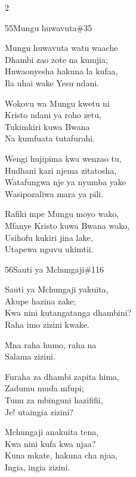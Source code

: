 \begin{multicols}{2}
\begin{hymn}{55}{Mungu huwavuta}{\#35}
\begin{stanza}
Mungu huwavuta watu waache\\
Dhambi zao zote na kumjia;\\
Huwaonyesha hakuna la kufaa,\\
Ila uhai wake Yesu ndani.
\end{stanza}
\begin{chorus}
Wokovu wa Mungu kwetu ni\\
Kristo ndani ya roho zetu,\\
Tukimkiri kuwa Bwana\\
Na kumfuata tutafurahi.
\end{chorus}
\begin{stanza}
Wengi hujipima kwa wenzao tu,\\
Hudhani kazi njema zitatosha,\\
Watafungwa nje ya nyumba yake\\
Wasipozaliwa mara ya pili.
\end{stanza}
\begin{stanza}
Rafiki mpe Mungu moyo wako,\\
Mfanye Kristo kuwa Bwana wako,\\
Usihofu kukiri jina lake,\\
Utapewa nguvu ukimtii.
\end{stanza}
\end{hymn}

\begin{hymn}{56}{Sauti ya Mchungaji}{\#116}
\begin{stanza}
Sauti ya Mchungaji yakuita,\\
Akupe hazina zake;\\
Kwa nini kutangatanga dhambini?\\
Raha imo zizini kwake.
\end{stanza}
\begin{chorus}
Mna raha humo, raha na\\
Salama zizini.
\end{chorus}
\begin{stanza}
Furaha za dhambi zapita hima,\\
Zadumu muda mfupi;\\
Tunu za mbinguni hazififii,\\
Je! utaingia zizini?
\end{stanza}
\begin{stanza}
Mchungaji anakuita tena,\\
Kwa nini kufa kwa njaa?\\
Kuna mkate, hakuna cha njaa,\\
Ingia, ingia zizini.
\end{stanza}
\end{hymn}


\end{multicols}
